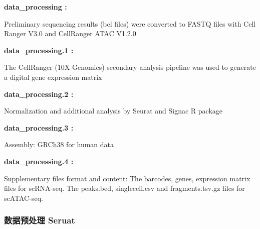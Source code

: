 \documentclass[
]{article}
\begin{document}
\begin{center}\begin{tcolorbox}[colback=gray!10, colframe=gray!50, width=0.9\linewidth, arc=1mm, boxrule=0.5pt]
\textbf{
data\_processing
:}

\vspace{0.5em}

    Preliminary sequencing results (bcl files) were
converted to FASTQ files with Cell Ranger V3.0 and
CellRanger ATAC V1.2.0

\vspace{2em}


\textbf{
data\_processing.1
:}

\vspace{0.5em}

    The CellRanger (10X Genomics) secondary analysis
pipeline was used to generate a digital gene expression
matrix

\vspace{2em}


\textbf{
data\_processing.2
:}

\vspace{0.5em}

    Normalization and additional analysis by Seurat and
Signac R package

\vspace{2em}


\textbf{
data\_processing.3
:}

\vspace{0.5em}

    Assembly: GRCh38 for human data

\vspace{2em}


\textbf{
data\_processing.4
:}

\vspace{0.5em}

    Supplementary files format and content: The barcodes,
genes, expression matrix files for scRNA-seq. The
peaks.bed, singlecell.csv and fragments.tsv.gz files for
scATAC-seq.

\vspace{2em}
\end{tcolorbox}
\end{center}

\hypertarget{ux6570ux636eux9884ux5904ux7406-seruat}{%
\subsubsection{数据预处理 Seruat}\label{ux6570ux636eux9884ux5904ux7406-seruat}}
\end{document}
